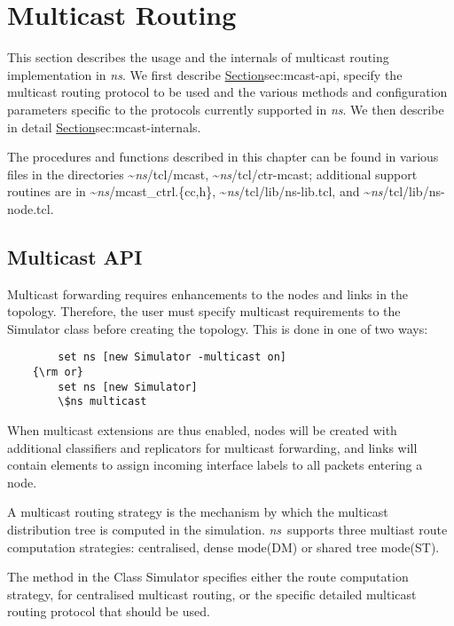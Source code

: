 \chapter{Multicast Routing}
\label{chap:multicast}

This section describes the usage and the internals of multicast
routing implementation in \emph{ns}.
We first describe 
\href{the user interface to enable multicast routing}{Section}{sec:mcast-api},
specify the multicast routing protocol to be used and the
various methods and configuration parameters specific to the
protocols currently supported in \emph{ns}.
We then describe in detail 
\href{the internals and the architecture of the
multicast routing implementation in \emph{ns}}{Section}{sec:mcast-internals}.

The procedures and functions described in this chapter can be found in
various files in the directories \textasciitilde\emph{ns}/{tcl/mcast}, \textasciitilde\emph{ns}/{tcl/ctr-mcast};
additional support routines
are in \textasciitilde\emph{ns}/{mcast\_ctrl.\{cc,h\}},
\textasciitilde\emph{ns}/{tcl/lib/ns-lib.tcl}, and \textasciitilde\emph{ns}/{tcl/lib/ns-node.tcl}.

\section{Multicast API}
\label{sec:mcast-api}

Multicast forwarding requires enhancements
to the nodes and links in the topology.
Therefore, the user must specify multicast requirements
to the Simulator class before creating the topology.
This is done in one of two ways:
\begin{verbatim}
        set ns [new Simulator -multicast on]
    {\rm or}
        set ns [new Simulator]
        \$ns multicast
\end{verbatim}                   %
When multicast extensions are thus enabled, nodes will be created with
additional classifiers and replicators for multicast forwarding, and
links will contain elements to assign incoming interface labels to all
packets entering a node.

A multicast routing strategy is the mechanism by which
the multicast distribution tree is computed in the simulation.
\emph{ns}\ supports three multiast route computation strategies:
        centralised, dense mode(DM) or shared tree mode(ST).

The method  in the Class Simulator specifies either
the route computation strategy, for centralised multicast routing, or
the specific detailed multicast routing protocol that should be used.


